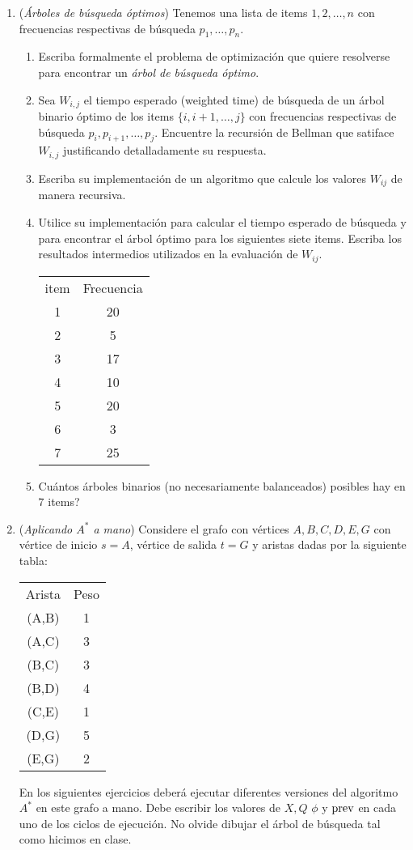 \documentclass[12pt, a4paper]{article}
\begin{document}
\begin{enumerate}
\item ({\it Árboles de búsqueda óptimos}) Tenemos una lista de items $1,2,\dots, n$ con frecuencias respectivas de búsqueda $p_1,\dots, p_n$.
\begin{enumerate}
\item Escriba formalmente el problema de optimización que quiere resolverse para encontrar un \emph{\'arbol de b\'usqueda \'optimo}.
\item Sea $W_{i,j}$ el tiempo esperado (weighted time) de búsqueda de un árbol binario óptimo de los items $\{i,i+1,\dots, j\}$ con frecuencias respectivas de búsqueda $p_i,p_{i+1},\dots, p_j$. Encuentre la recursión de Bellman que satiface $W_{i,j}$ justificando detalladamente su respuesta.
\item Escriba su implementación de un algoritmo que calcule los valores $W_{ij}$ de manera recursiva.
\item Utilice su implementación para calcular el tiempo esperado de búsqueda y para encontrar el árbol óptimo para los siguientes siete items. Escriba los resultados intermedios utilizados en la evaluación de $W_{ij}$.
\begin{center}
\begin{tabular}{c|c}
item & Frecuencia\\
1 & 20\\
2 & 5\\
3 & 17\\
4 & 10\\
5 & 20\\
6 & 3\\
7 & 25\\
\end{tabular}
\end{center}
\item Cuántos árboles binarios (no necesariamente balanceados) posibles hay en $7$ items?

\end{enumerate}

\item ({\it Aplicando $A^*$ a mano}) Considere el grafo con vértices $A,B,C,D,E,G$ con vértice de inicio $s=A$, vértice de salida $t=G$ y aristas dadas por la siguiente tabla:
\begin{center}
\begin{tabular}{c|c}
Arista & Peso\\
(A,B) & 1\\
(A,C) & 3\\
(B,C) & 3\\
(B,D) & 4\\
(C,E) & 1\\
(D,G) & 5\\
(E,G) & 2\\
\end{tabular}
\end{center}
En los siguientes ejercicios deberá ejecutar diferentes versiones del algoritmo $A^*$ en este grafo a mano. Debe escribir los valores de $X,Q$ $\phi$ y ${\rm prev}$ en cada uno de los ciclos de ejecución. No olvide dibujar el árbol de búsqueda tal como hicimos en clase.


\end{enumerate}
\end{document}
